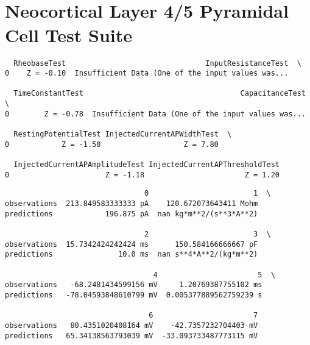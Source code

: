     \begin{center}
    \end{center}
    { \hspace*{\fill} \\}
    
    \begin{center}
    \end{center}
    { \hspace*{\fill} \\}
    
    \hypertarget{neocortical-layer-45-pyramidal-cell-test-suite}{%
\section{Neocortical Layer 4/5 Pyramidal Cell Test
Suite}\label{neocortical-layer-45-pyramidal-cell-test-suite}}

    
    
    \begin{verbatim}
  RheobaseTest                                InputResistanceTest  \
0    Z = -0.10  Insufficient Data (One of the input values was...   

  TimeConstantTest                                    CapacitanceTest  \
0        Z = -0.78  Insufficient Data (One of the input values was...   

  RestingPotentialTest InjectedCurrentAPWidthTest  \
0            Z = -1.50                   Z = 7.80   

  InjectedCurrentAPAmplitudeTest InjectedCurrentAPThresholdTest  
0                      Z = -1.18                       Z = 1.20  
    \end{verbatim}

    
    
    \begin{verbatim}
                                0                        1  \
observations  213.849583333333 pA    120.672073643411 Mohm   
predictions            196.875 pA  nan kg*m**2/(s**3*A**2)   

                                2                        3  \
observations  15.7342424242424 ms      150.584166666667 pF   
predictions               10.0 ms  nan s**4*A**2/(kg*m**2)   

                                  4                       5  \
observations   -68.2481434599156 mV     1.20769387755102 ms   
predictions   -78.04593848610799 mV  0.005377889562759239 s   

                                 6                       7  
observations   80.4351020408164 mV    -42.7357232704403 mV  
predictions   65.34138563793039 mV  -33.093733487773115 mV  
    \end{verbatim}

